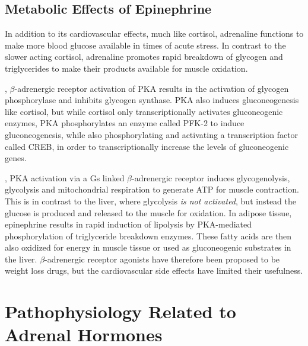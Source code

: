 \documentclass{tufte-handout}
\begin{document}
\subsection{Metabolic Effects of Epinephrine}

In addition to its cardiovascular effects, much like cortisol, adrenaline functions to make more blood glucose available in times of acute stress.  In contrast to the slower acting cortisol, adrenaline promotes rapid breakdown of glycogen and triglycerides to make their products available for muscle oxidation.

, $\beta$-adrenergic receptor activation of PKA results in the activation of glycogen phosphorylase and inhibits glycogen synthase.  PKA also induces gluconeogenesis like cortisol, but while cortisol only  transcriptionally activates gluconeogenic enzymes, PKA phosphorylates an enzyme called PFK-2 to induce gluconeogenesis, while also phosphorylating and activating a transcription factor called CREB, in order to transcriptionally increase the levels of gluconeogenic genes.

, PKA activation via a Gs linked $\beta$-adrenergic receptor induces glycogenolysis, glycolysis and mitochondrial respiration to generate ATP for muscle contraction.  This is in contrast to the liver, where glycolysis \emph{is not activated}, but instead the glucose is produced and released  to the muscle for oxidation.  In adipose tissue, epinephrine results in rapid induction of lipolysis by PKA-mediated phosphorylation of triglyceride breakdown enzymes.  These fatty acids are then also oxidized for energy in muscle tissue or used as gluconeogenic substrates in the liver.  $\beta$-adrenergic receptor agonists have therefore been proposed to be weight loss drugs, but the cardiovascular side effects have limited their usefulness.

\section{Pathophysiology Related to Adrenal Hormones}
\end{document}

